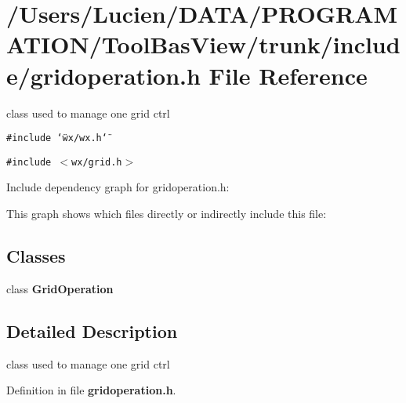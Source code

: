 \section{/Users/Lucien/DATA/PROGRAMATION/Tool\-Bas\-View/trunk/include/gridoperation.h File Reference}
\label{gridoperation_8h}
class used to manage one grid ctrl 

{\tt \#include \char`\"{}wx/wx.h\char`\"{}}\par
{\tt \#include $<$wx/grid.h$>$}\par


Include dependency graph for gridoperation.h:

This graph shows which files directly or indirectly include this file:\subsection*{Classes}
\begin{CompactItemize}
\item 
class {\bf Grid\-Operation}
\end{CompactItemize}


\subsection{Detailed Description}
class used to manage one grid ctrl 



Definition in file {\bf gridoperation.h}.